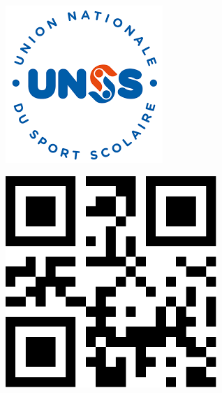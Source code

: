 \documentclass[a4paper,11pt,fleqn]{article}
\begin{document}
\Huge

\begin{block} %
{}\hfill {}
{}\hfill {}
\begin{minipage}{0.15\linewidth}
\includegraphics[width=\textwidth]{../logo-UNSS.png}
\end{minipage}
{}\hfill {}



\begin{minipage}{0.48\linewidth}
\includegraphics[width=8cm]{./1.pdf}


\end{minipage}
\end{block}
\end{document}
